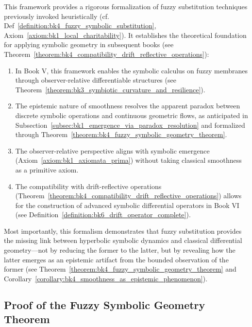 \begin{remark}
\label{remark:bk4_fuzzy}
This framework provides a rigorous formalization of fuzzy substitution techniques previously invoked heuristically (cf. Def~\ref{definition:bk4_fuzzy_symbolic_substitution}, Axiom~\ref{axiom:bk1_local_charitability}). It establishes the theoretical foundation for applying symbolic geometry in subsequent books (see Theorem~\ref{theorem:bk4_compatibility_drift_reflective_operations}):

\begin{enumerate}
    \item In Book V, this framework enables the symbolic calculus on fuzzy membranes through observer-relative differentiable structures (see Theorem~\ref{theorem:bk3_symbiotic_curvature_and_resilience}).
    
    \item The epistemic nature of smoothness resolves the apparent paradox between discrete symbolic operations and continuous geometric flows, as anticipated in Subsection~\ref{subsec:bk1_emergence_via_paradox_resolution} and formalized through Theorem~\ref{theorem:bk4_fuzzy_symbolic_geometry_theorem}.
    
    \item The observer-relative perspective aligns with symbolic emergence
    (Axiom~\ref{axiom:bk1_axiomata_prima}) without taking classical smoothness
    as a primitive axiom.
    
    \item The compatibility with drift-reflective operations (Theorem~\ref{theorem:bk4_compatibility_drift_reflective_operations}) allows for the construction of advanced symbolic differential operators in Book VI (see Definition~\ref{definition:bk6_drift_operator_complete}).
\end{enumerate}

Most importantly, this formalism demonstrates that fuzzy substitution provides the missing link between hyperbolic symbolic dynamics and classical differential geometry---not by reducing the former to the latter, but by revealing how the latter emerges as an epistemic artifact from the bounded observation of the former (see Theorem~\ref{theorem:bk4_fuzzy_symbolic_geometry_theorem} and Corollary~\ref{corollary:bk4_smoothness_as_epistemic_phenomenon}).
\end{remark}

\subsection{Proof of the Fuzzy Symbolic Geometry Theorem}
\label{subsec:bk4_proof_fuzzy_symbolic_geometry_theorem}

